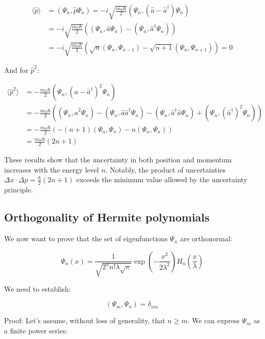 \documentclass[italian]{HKNdocument}
\begin{document}
\begin{align}
\langle\hat{p}\rangle &= (\Psi_n, \hat{p}\Psi_n) = -i\sqrt{\frac{m\omega\hbar}{2}}(\Psi_n, (\hat{a}-\hat{a}^\dagger)\Psi_n) \\
&= -i\sqrt{\frac{m\omega\hbar}{2}}((\Psi_n, \hat{a}\Psi_n) - (\Psi_n, \hat{a}^\dagger\Psi_n)) \\
&= -i\sqrt{\frac{m\omega\hbar}{2}}(\sqrt{n}(\Psi_n, \Psi_{n-1}) - \sqrt{n+1}(\Psi_n, \Psi_{n+1})) = 0
\end{align}

And for $\hat{p}^2$:

\begin{align}
\langle\hat{p}^2\rangle &= -\frac{m\omega\hbar}{2}(\Psi_n, (\hat{a}-\hat{a}^\dagger)^2\Psi_n) \\
&= -\frac{m\omega\hbar}{2}((\Psi_n, \hat{a}^2\Psi_n) - (\Psi_n, \hat{a}\hat{a}^\dagger\Psi_n) - (\Psi_n, \hat{a}^\dagger\hat{a}\Psi_n) + (\Psi_n, (\hat{a}^\dagger)^2\Psi_n)) \\
&= -\frac{m\omega\hbar}{2}(-(n+1)(\Psi_n, \Psi_n) - n(\Psi_n, \Psi_n)) \\
&= \frac{m\omega\hbar}{2}(2n+1) \label{eq:5.62}
\end{align}

These results show that the uncertainty in both position and momentum increases with the energy level $n$. Notably, the product of uncertainties $\Delta x \cdot \Delta p = \frac{\hbar}{2}(2n+1)$ exceeds the minimum value allowed by the uncertainty principle.

\subsection{Orthogonality of Hermite polynomials}

We now want to prove that the set of eigenfunctions $\Psi_n$ are orthonormal:

\begin{equation}
\Psi_n(x) = \frac{1}{\sqrt{2^n n!\lambda\sqrt{\pi}}}\exp\left(-\frac{x^2}{2\lambda^2}\right)H_n\left(\frac{x}{\lambda}\right) \label{eq:5.63}
\end{equation}

We need to establish:

\begin{equation}
(\Psi_m, \Psi_n) = \delta_{mn} \label{eq:5.64}
\end{equation}

Proof: Let's assume, without loss of generality, that $n \geq m$. We can express $\Psi_m$ as a finite power series:
\end{document}
